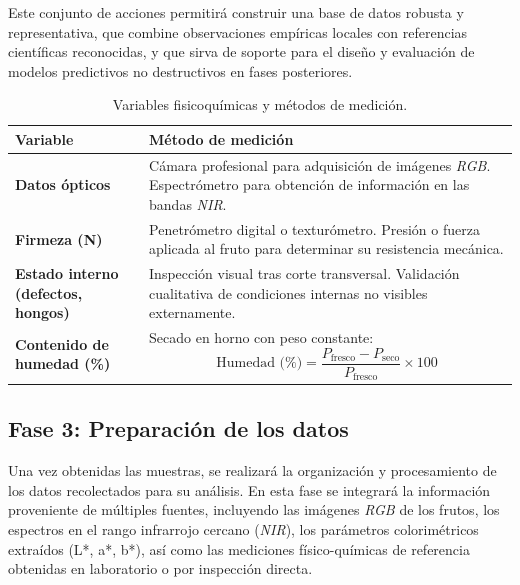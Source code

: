 Este conjunto de acciones permitirá construir una base de datos robusta y representativa, que combine observaciones empíricas locales con referencias científicas reconocidas, y que sirva de soporte para el diseño y evaluación de modelos predictivos no destructivos en fases posteriores.

\begin{table}[h]
\centering
\begin{tabular}{|p{4.5cm}|p{9cm}|}
\hline
\textbf{Variable} & \textbf{Método de medición} \\
\hline

\textbf{Datos ópticos} &
Cámara profesional para adquisición de imágenes \textit{RGB}. Espectrómetro para obtención de información en las bandas \textit{NIR}. \\
\hline

\textbf{Firmeza (N)} &
Penetrómetro digital o texturómetro. Presión o fuerza aplicada al fruto para determinar su resistencia mecánica. \\
\hline

\textbf{Estado interno (defectos, hongos)} &
Inspección visual tras corte transversal. Validación cualitativa de condiciones internas no visibles externamente. \\
\hline

\textbf{Contenido de humedad (\%)} &
Secado en horno con peso constante:
\[
\text{Humedad (\%)} = \frac{P_{\text{fresco}} - P_{\text{seco}}}{P_{\text{fresco}}} \times 100
\]
\\
\hline

\end{tabular}
\caption{Variables fisicoquímicas y métodos de medición.}
\label{tab:metodos}
\end{table}

\subsection{Fase 3: Preparación de los datos}

Una vez obtenidas las muestras, se realizará la organización y procesamiento de los datos recolectados para su análisis. En esta fase se integrará la información proveniente de múltiples fuentes, incluyendo las imágenes \textit{RGB} de los frutos, los espectros en el rango infrarrojo cercano (\textit{NIR}), los parámetros colorimétricos extraídos (L*, a*, b*), así como las mediciones físico-químicas de referencia obtenidas en laboratorio o por inspección directa.\\

